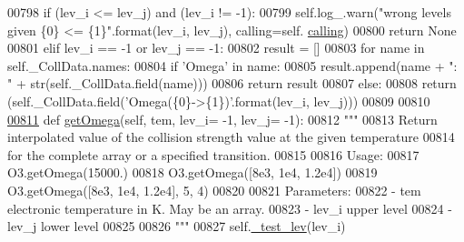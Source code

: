 \begin{DoxyCode}
{{00798         \textcolor{keywordflow}{if} (lev\_i <= lev\_j) \textcolor{keywordflow}{and} (lev\_i != -1):
00799             self.log\_.warn(\textcolor{stringliteral}{"wrong levels given \{0\} <= \{1\}"}.format(lev\_i, lev\_j), calling=self.
      \hyperlink{classpyneb_1_1core_1_1pynebcore_1_1___coll_data_fits_a43c9d096f9508cb475cb4fc3552e1979}{calling})
00800             \textcolor{keywordflow}{return} \textcolor{keywordtype}{None}            
00801         \textcolor{keywordflow}{elif} lev\_i == -1 \textcolor{keywordflow}{or} lev\_j == -1:
00802             result = []
00803             \textcolor{keywordflow}{for} name \textcolor{keywordflow}{in} self.\_CollData.names:
00804                 \textcolor{keywordflow}{if} \textcolor{stringliteral}{'Omega'} \textcolor{keywordflow}{in} name:
00805                     result.append(name + \textcolor{stringliteral}{": "} + str(self.\_CollData.field(name)))
00806             \textcolor{keywordflow}{return} result
00807         \textcolor{keywordflow}{else}:
00808             \textcolor{keywordflow}{return} (self.\_CollData.field(\textcolor{stringliteral}{'Omega(\{0\}->\{1\})'}.format(lev\_i, lev\_j)))
00809 
00810 
\hypertarget{pynebcore_8py_source_l00811}{}\hyperlink{classpyneb_1_1core_1_1pynebcore_1_1___coll_data_fits_a07beca7cf9ee37f231754f0458fb8c2f}{00811}     \textcolor{keyword}{def }\hyperlink{classpyneb_1_1core_1_1pynebcore_1_1___coll_data_fits_a07beca7cf9ee37f231754f0458fb8c2f}{getOmega}(self, tem, lev\_i= -1, lev\_j= -1):
00812         \textcolor{stringliteral}{"""}
00813 \textcolor{stringliteral}{        Return interpolated value of the collision strength value at the given temperature }
00814 \textcolor{stringliteral}{            for the complete array or a specified transition.}
00815 \textcolor{stringliteral}{}
00816 \textcolor{stringliteral}{        Usage:}
00817 \textcolor{stringliteral}{            O3.getOmega(15000.)}
00818 \textcolor{stringliteral}{            O3.getOmega([8e3, 1e4, 1.2e4])}
00819 \textcolor{stringliteral}{            O3.getOmega([8e3, 1e4, 1.2e4], 5, 4)}
00820 \textcolor{stringliteral}{        }
00821 \textcolor{stringliteral}{        Parameters:}
00822 \textcolor{stringliteral}{            - tem    electronic temperature in K. May be an array.}
00823 \textcolor{stringliteral}{            - lev\_i  upper level}
00824 \textcolor{stringliteral}{            - lev\_j  lower level}
00825 \textcolor{stringliteral}{}
00826 \textcolor{stringliteral}{        """}
00827         self.\hyperlink{classpyneb_1_1core_1_1pynebcore_1_1___coll_data_fits_a7bc932cc0743068d924a2ac51af0b4d4}{\_test\_lev}(lev\_i)
}}
\end{DoxyCode}
